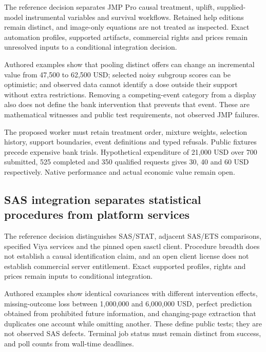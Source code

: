 The reference decision separates JMP Pro causal treatment, uplift,
supplied- model instrumental variables and survival workflows. Retained
help editions remain distinct, and image-only equations are not treated
as inspected. Exact automation profiles, supported artifacts, commercial
rights and prices remain unresolved inputs to a conditional integration
decision. \citep{exec24_jmp_choice}

Authored examples show that pooling distinct offers can change an
incremental value from 47,500 to 62,500 USD; selected noisy subgroup
scores can be optimistic; and observed data cannot identify a dose
outside their support without extra restrictions. Removing a
competing-event category from a display also does not define the bank
intervention that prevents that event. These are mathematical witnesses
and public test requirements, not observed JMP failures.
\citep{exec24_jmp_choice}

The proposed worker must retain treatment order, mixture weights,
selection history, support boundaries, event definitions and typed
refusals. Public fixtures precede expensive bank trials. Hypothetical
expenditure of 21,000 USD over 700 submitted, 525 completed and 350
qualified requests gives 30, 40 and 60 USD respectively. Native
performance and actual economic value remain open.
\citep{exec24_jmp_choice}

\hypertarget{sas-integration-separates-statistical-procedures-from-platform-services}{%
\subsection{SAS integration separates statistical procedures from
platform
services}\label{sas-integration-separates-statistical-procedures-from-platform-services}}

The reference decision distinguishes SAS/STAT, adjacent SAS/ETS
comparisons, specified Viya services and the pinned open sasctl client.
Procedure breadth does not establish a causal identification claim, and
an open client license does not establish commercial server entitlement.
Exact supported profiles, rights and prices remain inputs to conditional
integration. \citep{exec24_sas_choice}

Authored examples show identical covariances with different intervention
effects, missing-outcome loss between 1,000,000 and 6,000,000 USD,
perfect prediction obtained from prohibited future information, and
changing-page extraction that duplicates one account while omitting
another. These define public tests; they are not observed SAS defects.
Terminal job status must remain distinct from success, and poll counts
from wall-time deadlines. \citep{exec24_sas_choice}

